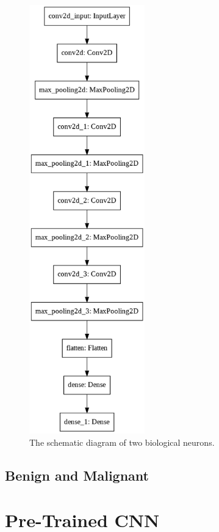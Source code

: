 \documentclass{book}
\begin{document}
        


        \begin{figure}[h]
            \centering
            \includegraphics[width=5cm]{smc-best-model.png}
            \caption{The schematic diagram of two biological neurons.}\label{fig:neurons}
        \end{figure}

        \section{Benign and Malignant}  %

    
    \chapter{Pre-Trained CNN}
\end{document}
